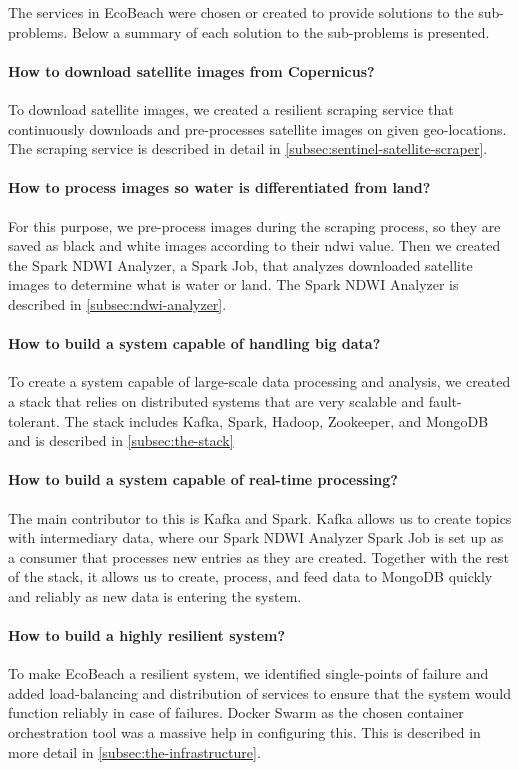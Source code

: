 \noindent
The services in EcoBeach were chosen or created to provide solutions to the sub-problems. Below a summary of each solution to the sub-problems is presented.

\paragraph{How to download satellite images from Copernicus?} To download satellite images, we created a resilient scraping service that continuously downloads and pre-processes satellite images on given geo-locations. The scraping service is described in detail in \autoref{subsec:sentinel-satellite-scraper}.

\paragraph{How to process images so water is differentiated from land?} For this purpose, we pre-process images during the scraping process, so they are saved as black and white images according to their \acrfull{ndwi} value. Then we created the Spark NDWI Analyzer, a Spark Job, that analyzes downloaded satellite images to determine what is water or land. The Spark NDWI Analyzer is described in \autoref{subsec:ndwi-analyzer}.

\paragraph{How to build a system capable of handling big data?} To create a system capable of large-scale data processing and analysis, we created a stack that relies on distributed systems that are very scalable and fault-tolerant. The stack includes Kafka, Spark, Hadoop, Zookeeper, and MongoDB and is described in \autoref{subsec:the-stack}

\paragraph{How to build a system capable of real-time processing?} The main contributor to this is Kafka and Spark. Kafka allows us to create topics with intermediary data, where our Spark NDWI Analyzer Spark Job is set up as a consumer that processes new entries as they are created. Together with the rest of the stack, it allows us to create, process, and feed data to MongoDB quickly and reliably as new data is entering the system.

\paragraph{How to build a highly resilient system?} To make EcoBeach a resilient system, we identified single-points of failure and added load-balancing and distribution of services to ensure that the system would function reliably in case of failures. Docker Swarm as the chosen container orchestration tool was a massive help in configuring this. This is described in more detail in \autoref{subsec:the-infrastructure}.

